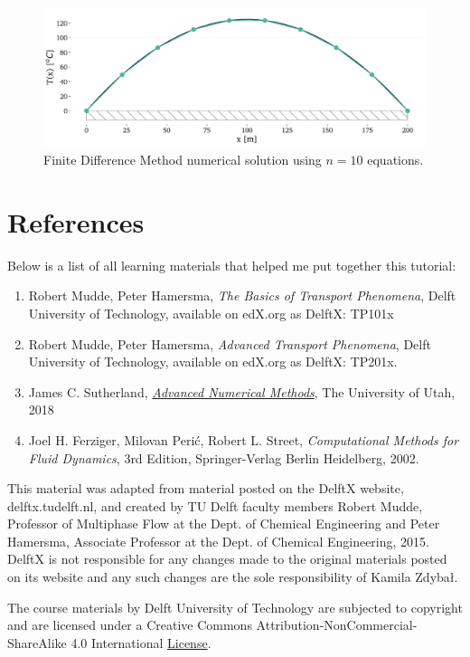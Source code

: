 \documentclass[20pt]{report}
\begin{document}
\begin{figure}[H]
\centering\includegraphics[width=12cm]{plots/example-heat-transfer-in-a-rod-FDM-n10.png}
\caption{Finite Difference Method numerical solution using $n=10$ equations.}
\label{fig:FDM-solution}
\end{figure}

\section*{References}

Below is a list of all learning materials that helped me put together this tutorial:

\begin{enumerate}
\item Robert Mudde, Peter Hamersma, \textit{The Basics of Transport Phenomena}, Delft University of Technology, available on edX.org as DelftX: TP101x
\item Robert Mudde, Peter Hamersma, \textit{Advanced Transport Phenomena}, Delft University of Technology, available on edX.org as DelftX: TP201x.
\item James C. Sutherland, \textit{\href{https://sutherland.che.utah.edu/teaching/chen6703/lectures-schedule/}{Advanced Numerical Methods}}, The University of Utah, 2018
\item Joel H. Ferziger, Milovan Perić, Robert L. Street, \textit{Computational Methods for Fluid Dynamics}, 3rd Edition, Springer-Verlag Berlin Heidelberg, 2002.
\end{enumerate}

This material was adapted from material posted on the DelftX website, delftx.tudelft.nl, and created by TU Delft faculty members Robert Mudde, Professor of Multiphase Flow at the Dept. of Chemical Engineering and Peter Hamersma, Associate Professor at the Dept. of Chemical Engineering, 2015. DelftX is not responsible for any changes made to the original materials posted on its website and any such changes are the sole responsibility of Kamila Zdybał.

The course materials by Delft University of Technology are subjected to copyright and are licensed under a Creative Commons Attribution-NonCommercial-ShareAlike 4.0 International \href{https://creativecommons.org/licenses/by-nc-sa/4.0/}{License}.
\end{document}
